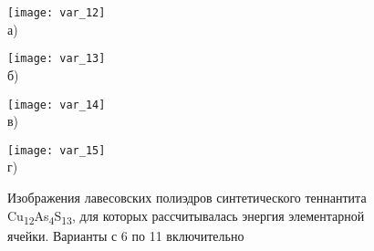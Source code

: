 \begin{figure}[p!]
  \begin{minipage}[ht]{0.45\linewidth}\centering
    \texttt{[image: var\_12]} \\ а)
  \end{minipage}
\hfill
 \begin{minipage}[ht]{0.45\linewidth}\centering
    \texttt{[image: var\_13]} \\ б)
  \end{minipage}
\vfill
  \begin{minipage}[ht]{0.45\linewidth}\centering
    \texttt{[image: var\_14]} \\ в)
  \end{minipage}
	\hfill
 \begin{minipage}[ht]{0.45\linewidth}\centering
    \texttt{[image: var\_15]} \\ г)
  \end{minipage}
\vfill

  \begin{minipage}[ht]{0.45\linewidth}\centering
   
  \end{minipage}
						\hfill
 \begin{minipage}[ht]{0.45\linewidth}\centering
    
  \end{minipage}
      \caption[Изображения лавесовских полиэдров синтетического теннантита Cu\textsubscript{12}As\textsubscript{4}S\textsubscript{13}, для которых рассчитывалась энергия элементарной ячейки. Варианты с 12 по 15 включительно]{Изображения лавесовских полиэдров синтетического теннантита Cu\textsubscript{12}As\textsubscript{4}S\textsubscript{13}, для которых рассчитывалась энергия элементарной ячейки. Варианты с 6 по 11 включительно}
    \label{img:laves3}
\end{figure}


